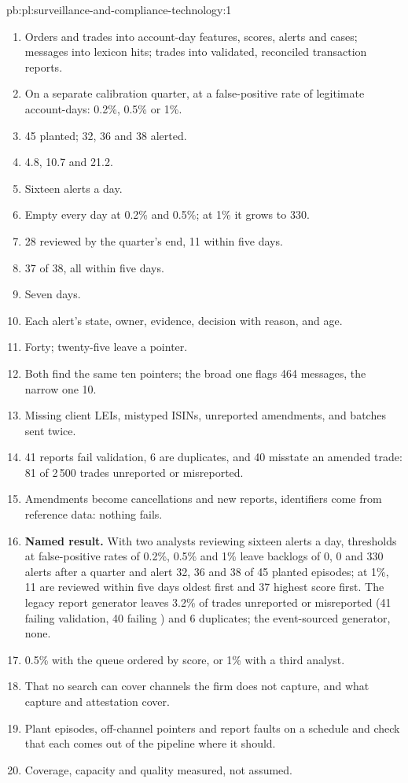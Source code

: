 \begin{solution}{pb:pl:surveillance-and-compliance-technology:1}
\begin{enumerate}
\item Orders and trades into account-day features, scores, alerts and cases; messages into lexicon hits; trades into validated, reconciled
transaction reports.
\item On a separate calibration quarter, at a false-positive rate of legitimate account-days: 0.2\%, 0.5\% or 1\%.
\item 45 planted; 32, 36 and 38 alerted.
\item 4.8, 10.7 and 21.2.
\item Sixteen alerts a day.
\item Empty every day at 0.2\% and 0.5\%; at 1\% it grows to 330.
\item 28 reviewed by the quarter's end, 11 within five days.
\item 37 of 38, all within five days.
\item Seven days.
\item Each alert's state, owner, evidence, decision with reason, and age.
\item Forty; twenty-five leave a pointer.
\item Both find the same ten pointers; the broad one flags 464 messages, the narrow one 10.
\item Missing client LEIs, mistyped ISINs, unreported amendments, and batches sent twice.
\item 41 reports fail validation, 6 are duplicates, and 40 misstate an amended trade: 81 of 2\,500 trades unreported or misreported.
\item Amendments become cancellations and new reports, identifiers come from reference data: nothing fails.
\item \textbf{Named result.} With two analysts reviewing sixteen alerts a day, thresholds at false-positive rates of 0.2\%, 0.5\% and 1\% leave
backlogs of 0, 0 and 330 alerts after a quarter and alert 32, 36 and 38 of 45 planted episodes; at 1\%, 11 are reviewed within five days oldest
first and 37 highest score first. The legacy report generator leaves 3.2\% of trades unreported or misreported (41 failing validation, 40 failing
) and 6 duplicates; the event-sourced generator, none.
\item 0.5\% with the queue ordered by score, or 1\% with a third analyst.
\item That no search can cover channels the firm does not capture, and what capture and attestation cover.
\item Plant episodes, off-channel pointers and report faults on a schedule and check that each comes out of the pipeline where it should.
\item Coverage, capacity and quality measured, not assumed.
\end{enumerate}
\end{solution}

